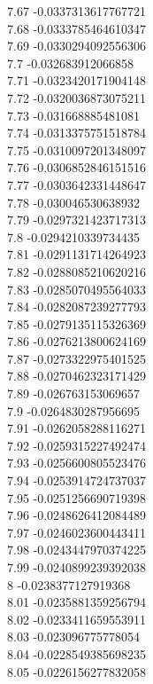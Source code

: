 {7.67	-0.0337313617767721\\
7.68	-0.0333785464610347\\
7.69	-0.0330294092556306\\
7.7	-0.032683912066858\\
7.71	-0.0323420171904148\\
7.72	-0.0320036873075211\\
7.73	-0.031668885481081\\
7.74	-0.0313375751518784\\
7.75	-0.0310097201348097\\
7.76	-0.0306852846151516\\
7.77	-0.0303642331448647\\
7.78	-0.030046530638932\\
7.79	-0.0297321423717313\\
7.8	-0.0294210339734435\\
7.81	-0.0291131714264923\\
7.82	-0.0288085210620216\\
7.83	-0.0285070495564033\\
7.84	-0.0282087239277793\\
7.85	-0.0279135115326369\\
7.86	-0.0276213800624169\\
7.87	-0.0273322975401525\\
7.88	-0.0270462323171429\\
7.89	-0.026763153069657\\
7.9	-0.0264830287956695\\
7.91	-0.0262058288116271\\
7.92	-0.0259315227492474\\
7.93	-0.0256600805523476\\
7.94	-0.0253914724737037\\
7.95	-0.0251256690719398\\
7.96	-0.0248626412084489\\
7.97	-0.0246023600443411\\
7.98	-0.0243447970374225\\
7.99	-0.0240899239392038\\
8	-0.0238377127919368\\
8.01	-0.0235881359256794\\
8.02	-0.0233411659553911\\
8.03	-0.023096775778054\\
8.04	-0.0228549385698235\\
8.05	-0.0226156277832058\\
}
